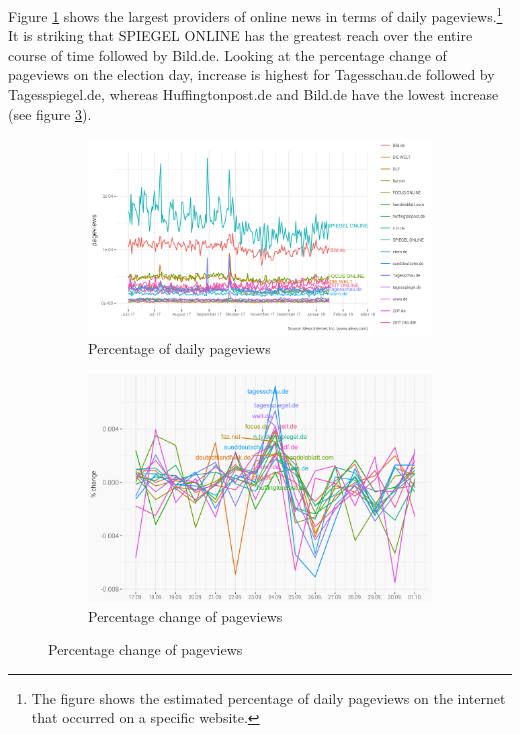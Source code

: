 \documentclass[12pt,a4paper,notitlepage]{article}
\begin{document}
Figure \ref{fig_reach} shows the largest providers of online news in terms of daily pageviews.\footnote{The figure shows the estimated percentage of daily pageviews on the internet that occurred on a specific website.} It is striking that SPIEGEL ONLINE has the greatest reach over the entire course of time followed by Bild.de. Looking at the percentage change of pageviews on the election day, increase is highest for Tagesschau.de followed by Tagesspiegel.de, whereas Huffingtonpost.de and Bild.de have the lowest increase (see figure \ref{fig_change}).

\begin{figure}[H]
	\caption{}
	\begin{center}
		\begin{subfigure}[normla]{0.49\textwidth}
			\includegraphics[width=\textwidth]{../figs/reach.png}
			\caption{Percentage of daily pageviews}
			\label{fig_reach}
		\end{subfigure}
		\begin{subfigure}[normla]{0.49\textwidth}
			\includegraphics[width=\textwidth]{../figs/perc_change.png}
			\caption{Percentage change of pageviews}
			\label{fig_change}
		\end{subfigure}
	\end{center}
\end{figure}
\end{document}
